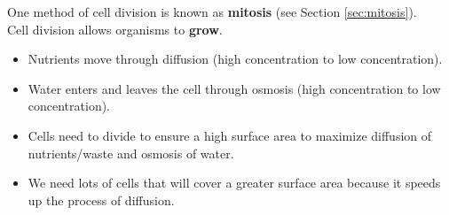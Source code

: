 \documentclass[12pt]{report}
\begin{document}
One method of cell division is known as \textbf{mitosis} (see Section \ref{sec:mitosis}).\\

Cell division allows organisms to \textbf{grow}. 
\begin{itemize}
    \item{Nutrients move through diffusion (high concentration to low concentration).}
    \item{Water enters and leaves the cell through osmosis (high concentration to low concentration).}
    \item{Cells need to divide to ensure a high surface area to maximize diffusion of nutrients/waste and osmosis of water.}
    \item{We need lots of cells that will cover a greater surface area because it speeds up the process of diffusion.}
\end{itemize}
\end{document}
